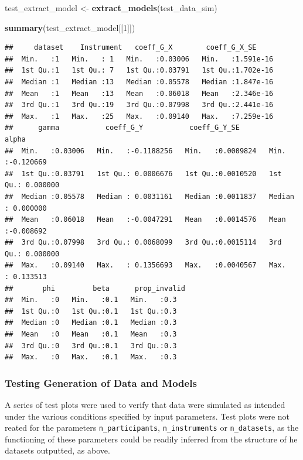 \documentclass[
]{article}
\newenvironment{Shaded}{\begin{snugshade}}{\end{snugshade}}
\newcommand{\DecValTok}[1]{\textcolor[rgb]{0.00,0.00,0.81}{#1}}
\newcommand{\FunctionTok}[1]{\textcolor[rgb]{0.13,0.29,0.53}{\textbf{#1}}}
\newcommand{\NormalTok}[1]{#1}
\newcommand{\OtherTok}[1]{\textcolor[rgb]{0.56,0.35,0.01}{#1}}
\begin{document}
\begin{Shaded}
\begin{Highlighting}[]
\NormalTok{ test\_extract\_model }\OtherTok{\textless{}{-}} \FunctionTok{extract\_models}\NormalTok{(test\_data\_sim)}

 \FunctionTok{summary}\NormalTok{(test\_extract\_model[[}\DecValTok{1}\NormalTok{]])}
\end{Highlighting}
\end{Shaded}

\begin{verbatim}
##     dataset    Instrument   coeff_G_X        coeff_G_X_SE      
##  Min.   :1   Min.   : 1   Min.   :0.03006   Min.   :1.591e-16  
##  1st Qu.:1   1st Qu.: 7   1st Qu.:0.03791   1st Qu.:1.702e-16  
##  Median :1   Median :13   Median :0.05578   Median :1.847e-16  
##  Mean   :1   Mean   :13   Mean   :0.06018   Mean   :2.346e-16  
##  3rd Qu.:1   3rd Qu.:19   3rd Qu.:0.07998   3rd Qu.:2.441e-16  
##  Max.   :1   Max.   :25   Max.   :0.09140   Max.   :7.259e-16  
##      gamma           coeff_G_Y           coeff_G_Y_SE           alpha          
##  Min.   :0.03006   Min.   :-0.1188256   Min.   :0.0009824   Min.   :-0.120669  
##  1st Qu.:0.03791   1st Qu.: 0.0006676   1st Qu.:0.0010520   1st Qu.: 0.000000  
##  Median :0.05578   Median : 0.0031161   Median :0.0011837   Median : 0.000000  
##  Mean   :0.06018   Mean   :-0.0047291   Mean   :0.0014576   Mean   :-0.008692  
##  3rd Qu.:0.07998   3rd Qu.: 0.0068099   3rd Qu.:0.0015114   3rd Qu.: 0.000000  
##  Max.   :0.09140   Max.   : 0.1356693   Max.   :0.0040567   Max.   : 0.133513  
##       phi         beta      prop_invalid
##  Min.   :0   Min.   :0.1   Min.   :0.3  
##  1st Qu.:0   1st Qu.:0.1   1st Qu.:0.3  
##  Median :0   Median :0.1   Median :0.3  
##  Mean   :0   Mean   :0.1   Mean   :0.3  
##  3rd Qu.:0   3rd Qu.:0.1   3rd Qu.:0.3  
##  Max.   :0   Max.   :0.1   Max.   :0.3
\end{verbatim}

\subsubsection{Testing Generation of Data and Models}\label{testing-generation-of-data-and-models}

A series of test plots were used to verify that data were simulated as intended under the various conditions specified by input parameters. Test plots were not reated for the parameters \texttt{n\_participants}, \texttt{n\_instruments} or \texttt{n\_datasets}, as the functioning of these parameters could be readily inferred from the structure of he datasets outputted, as above.
\end{document}
